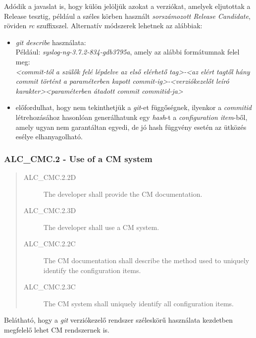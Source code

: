 Adódik a javaslat is, hogy külön jelöljük azokat a verziókat, amelyek eljutottak a Release tesztig,
például a széles körben használt \emph{sorszámozott Release Candidate}, röviden \emph{rc}
szuffixszel.
Alternatív módszerek lehetnek az alábbiak:
\begin{itemize}
    \item \emph{git describe} használata: \\
        Például: \emph{syslog-ng-3.7.2-834-gdb3795a}, amely az alábbi formátumnak felel meg: \\
        \emph{<commit-tól a szülők felé lépdelve az első elérhető tag>-<az elért tagtől hány commit
            történt a paraméterben kapott commit-ig>-<verziókezelőt leíró karakter><paraméterben
        átadott commit commitid-ja>}
    \item előfordulhat, hogy nem tekinthetjük a \emph{git}-et függőségnek, ilyenkor
        a \emph{commitid} létrehozásához hasonlóan generálhatunk egy \emph{hash}-t
        a \emph{configuration item}-ből, amely ugyan nem garantáltan egyedi, de jó hash függvény
        esetén az ütközés esélye elhanyagolható.
\end{itemize}

\pagebreak[3]
\subsubsection{ALC\_CMC.2 - Use of a CM system}

\begin{quote}
    \begin{description}
        \item[ALC\_CMC.2.2D]{The developer shall provide the CM documentation.}
        \item[ALC\_CMC.2.3D]{The developer shall use a CM system.}
        \item[ALC\_CMC.2.2C]{The CM documentation shall describe the method used to uniquely
            identify the configuration items.}
        \item[ALC\_CMC.2.3C]{The CM system shall uniquely identify all configuration items.}
    \end{description}
\end{quote}
Belátható, hogy a \emph{git} verziókezelő rendszer széleskörű használata kezdetben megfelelő
lehet CM rendszernek is.

\pagebreak[1]
